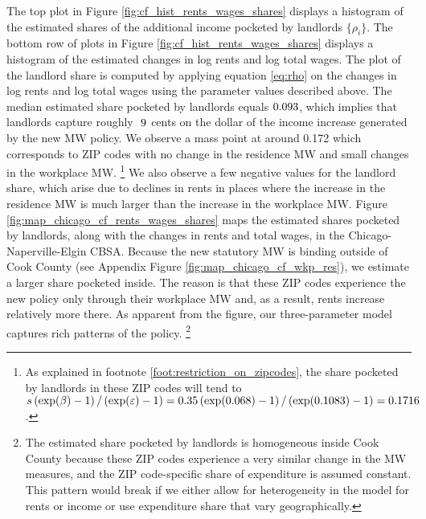 The top plot in Figure \ref{fig:cf_hist_rents_wages_shares} displays a histogram 
of the estimated shares of the additional income pocketed by landlords 
$\{\rho_i\}$.
The bottom row of plots in Figure \ref{fig:cf_hist_rents_wages_shares} displays 
a histogram of the estimated changes in log rents and log total wages.
The plot of the landlord share is computed by applying equation \eqref{eq:rho} 
on the changes in log rents and log total wages using the parameter values
described above.
The median estimated share pocketed by landlords equals $\textnormal{0.093}$, which implies 
that landlords capture roughly $\textnormal{ 9}$ cents on the dollar of the income increase 
generated by the new MW policy.
We observe a mass point at around 0.172 which corresponds to ZIP codes with
no change in the residence MW and small changes in the workplace MW.%
\footnote{As explained in footnote \ref{foot:restriction_on_zipcodes}, the 
share pocketed by landlords in these ZIP codes will tend to
$s \left(\exp(\beta)-1\right)/\left(\exp(\varepsilon)-1\right) 
= 0.35 \left(\exp(\textnormal{0.068})-1\right)/
     \left(\exp(0.1083)-1\right)
= 0.1716$.}
We also observe a few negative values for the landlord share, which
arise due to declines in rents in places where the increase in the residence MW
is much larger than the increase in the workplace MW.
Figure \ref{fig:map_chicago_cf_rents_wages_shares} maps the estimated shares 
pocketed by landlords, along with the changes in rents and total wages, in the 
Chicago-Naperville-Elgin CBSA.
Because the new statutory MW is binding outside of Cook County 
(see Appendix Figure \ref{fig:map_chicago_cf_wkp_res}), 
we estimate a larger share pocketed inside.
The reason is that these ZIP codes experience the new policy only through
their workplace MW and, as a result,
rents increase relatively more there.
As apparent from the figure, our three-parameter model captures rich patterns
of the policy.%
\footnote{The estimated share pocketed by landlords is homogeneous inside 
Cook County because these ZIP codes experience a very similar change in the 
MW measures, and the ZIP code-specific share of expenditure is assumed constant.
This pattern would break if we either allow for heterogeneity in the model for 
rents or income or use expenditure share that vary geographically.}

